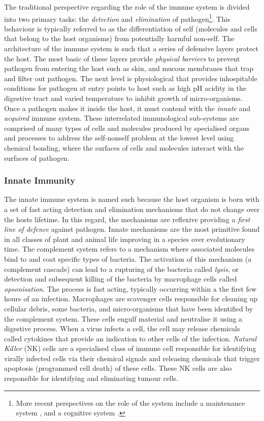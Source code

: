 The traditional perspective regarding the role of the immune system is divided into two primary tasks: the \emph{detection} and \emph{elimination} of pathogen\footnote{More recent perspectives on the role of the system include a maintenance system \cite{Cohen2001a}, and a cognitive system \cite{Varela1994}.}. This behaviour is typically referred to as the differentiation of self (molecules and cells that belong to the host organisms) from potentially harmful non-self. The architecture of the immune system is such that a series of defensive layers protect the host. The most basic of these layers provide \emph{physical barriers} to prevent pathogen from entering the host such as skin, and mucous membranes that trap and filter out pathogen. The next level is physiological that provides inhospitable conditions for pathogen at entry points to host such as high pH acidity in the digestive tract and varied temperature to inhibit growth of micro-organisms. Once a pathogen makes it inside the host, it must contend with the \emph{innate} and \emph{acquired} immune system. These interrelated immunological sub-systems are comprised of many types of cells  and molecules produced by specialised organs and processes to address the self-nonself problem at the lowest level using chemical bonding, where the surfaces of cells and molecules interact with the surfaces of pathogen.

%
%
\subsubsection{Innate Immunity}
The innate immune system is named such because the host organism is born with a set of fast acting detection and elimination mechanisms that do not change over the hosts lifetime. In this regard, the mechanisms are reflexive providing a \emph{first line of defence} against pathogen. Innate mechanisms are the most primitive found in all classes of plant and animal life improving in a species over evolutionary time. 
The complement system refers to a mechanism where associated molecules bind to and coat specific types of bacteria. The activation of this mechanism (a complement cascade) can lead to a rupturing of the bacteria called \emph{lysis}, or detection and subsequent killing of the bacteria by macrophage cells called \emph{opsonisation}. The process is fast acting, typically occurring within a the first few hours of an infection. Macrophages are scavenger cells responsible for cleaning up cellular debris, some bacteria, and micro-organisms that have been identified by the complement system. These cells engulf material and neutralise it using a digestive process. When a virus infects a cell, the cell may release chemicals called cytokines that provide an indication to other cells of the infection. \emph{Natural Killer} (NK) cells are a specialised class of immune cell responsible for identifying virally infected cells via their chemical signals and releasing chemicals that trigger apoptosis (programmed cell death) of these cells. These NK cells are also responsible for identifying and eliminating tumour cells. 

